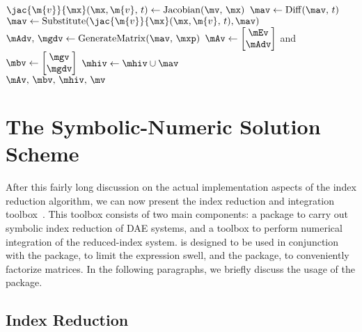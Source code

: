 \begin{breakablealgorithm}
\begin{algorithmic}[1]
        \State $\jac{\m{v}}{\mx}(\mx, \m{v}, \, t) \gets \mathrm{Jacobian}(\mv, \, \mx)$ 
        \State $\mav \gets \mathrm{Diff}(\mav, \, t)$ 
        \State $\mav \gets \mathrm{Substitute}(\jac{\m{v}}{\mx}(\mx, \m{v}, \, t), \mav)$ 
        \State $\mAdv, \, \mgdv \gets \mathrm{GenerateMatrix}(\mav, \, \mxp)$ 
        \State $\mAv \gets \begin{bmatrix} \mEv \\ \mAdv \end{bmatrix}$ and $\mbv \gets \begin{bmatrix} \mgv \\ \mgdv \end{bmatrix}$
        \State $\mhiv \gets \mhiv \cup \mav$ 
      \EndWhile \\
      \Return $\mAv, \, \mbv, \, \mhiv, \, \mv$ 
    \EndProcedure
  \end{algorithmic}
\end{breakablealgorithm}


\section{The Symbolic-Numeric Solution Scheme}
\label{chap4:sec:indigo}

After this fairly long discussion on the actual implementation aspects of the index reduction algorithm, we can now present the \Indigo{} index reduction and integration toolbox~\cite{indigo}. This toolbox consists of two main components: a \Maple{} package to carry out symbolic index reduction of \ac{DAE} systems, and a \Matlab{} toolbox to perform numerical integration of the reduced-index system. \Indigo{} is designed to be used in conjunction with the \LEM{} package, to limit the expression swell, and the \LAST{} package, to conveniently factorize matrices. In the following paragraphs, we briefly discuss the usage of the \Indigo{} package.

\subsection{Index Reduction}

